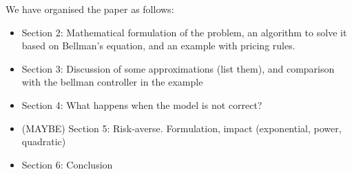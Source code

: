 \documentclass[main.tex]{subfiles}
\begin{document}
We have organised the paper as follows:
\begin{itemize}
\item Section 2: Mathematical formulation of the problem, an algorithm
  to solve it based on Bellman's equation, and an example with pricing rules.
\item Section 3: Discussion of some approximations (list them), and
  comparison with the bellman controller in the example
\item Section 4: What happens when the model is not correct?
\item (MAYBE) Section 5: Risk-averse. Formulation, impact
  (exponential, power, quadratic)
\item Section 6: Conclusion
\end{itemize}


\biblio
\end{document}
